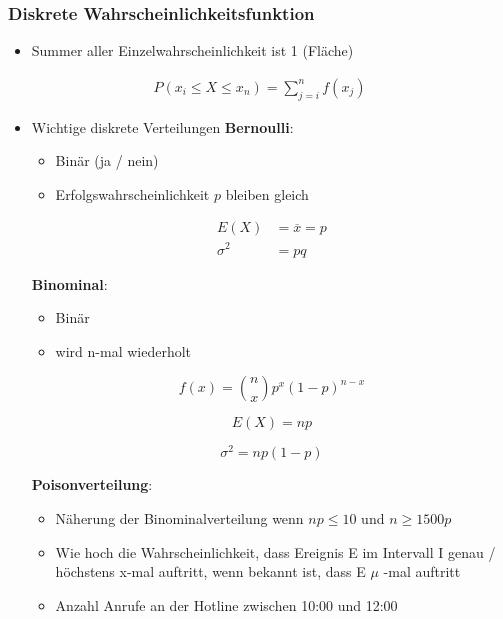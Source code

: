\documentclass[11pt,twoside,landscape]{article}
\begin{document}
\begin{multicols}{3}
\subsubsection*{Diskrete Wahrscheinlichkeitsfunktion}
\label{sec:org1e39eb1}
\begin{itemize}
\item Summer aller Einzelwahrscheinlichkeit ist 1 (Fläche)
\end{itemize}
\begin{align*}
P(x_i \leq X \leq x_n) = \sum_{j=i}^{n} f(x_j)
\end{align*}

\begin{itemize}
\item Wichtige diskrete Verteilungen
\label{sec:orgef8a9e4}
\textbf{Bernoulli}:
\begin{itemize}
\item Binär (ja / nein)
\item Erfolgswahrscheinlichkeit \(p\) bleiben gleich
\end{itemize}
\begin{align*}
E(X) &= \overline{x} = p \\
\sigma^2 &= pq
\end{align*}

\textbf{Binominal}:
\begin{itemize}
\item Binär
\item wird n-mal wiederholt
\end{itemize}
\begin{equation*}
f(x) = \binom{n}{x}p^x(1-p)^{n-x}
\end{equation*}

\begin{equation*}
E(X) = np
\end{equation*}

\begin{equation*}
\sigma^2 = np(1-p)
\end{equation*}

\textbf{Poisonverteilung}:
\begin{itemize}
\item Näherung der Binominalverteilung wenn \(np \leq 10\) und \(n \geq 1500p\)
\item Wie hoch die Wahrscheinlichkeit, dass Ereignis E im Intervall I genau / höchstens x-mal auftritt, wenn bekannt ist, dass E \(\mu\) -mal auftritt
\item Anzahl Anrufe an der Hotline zwischen 10:00 und 12:00
\end{itemize}


\end{itemize}
\end{multicols}
\end{document}
